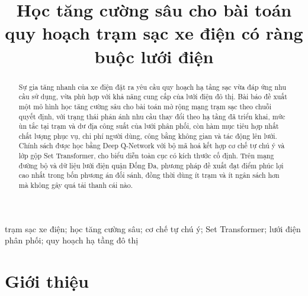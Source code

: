 \documentclass[10pt, conference, a4paper, compsocconf]{IEEEtran}
\begin{document}
\fontsize{10}{12}
\selectfont


\title{Học tăng cường sâu cho bài toán quy hoạch trạm sạc xe điện có ràng buộc lưới điện}

\author{
}

\maketitle

\begin{abstract}
Sự gia tăng nhanh của xe điện đặt ra yêu cầu quy hoạch hạ tầng sạc vừa đáp ứng nhu cầu sử dụng, vừa phù hợp với khả năng cung cấp của lưới điện đô thị. Bài báo đề xuất một mô hình học tăng cường sâu cho bài toán mở rộng mạng trạm sạc theo chuỗi quyết định, với trạng thái phản ánh nhu cầu thay đổi theo hạ tầng đã triển khai, mức ùn tắc tại trạm và dư địa công suất của lưới phân phối, còn hàm mục tiêu hợp nhất chất lượng phục vụ, chi phí người dùng, công bằng không gian và tác động lên lưới. Chính sách được học bằng Deep Q-Network với bộ mã hoá kết hợp cơ chế tự chú ý và lớp gộp Set Transformer, cho biểu diễn toàn cục có kích thước cố định. Trên mạng đường bộ và dữ liệu lưới điện quận Đống Đa, phương pháp đề xuất đạt điểm phúc lợi cao nhất trong bốn phương án đối sánh, đồng thời dùng ít trạm và ít ngân sách hơn mà không gây quá tải thanh cái nào.
\end{abstract}

\begin{IEEEkeywords}
trạm sạc xe điện; học tăng cường sâu; cơ chế tự chú ý; Set Transformer;
lưới điện phân phối; quy hoạch hạ tầng đô thị
\end{IEEEkeywords}

\IEEEpeerreviewmaketitle

\section{Giới thiệu}
\end{document}
